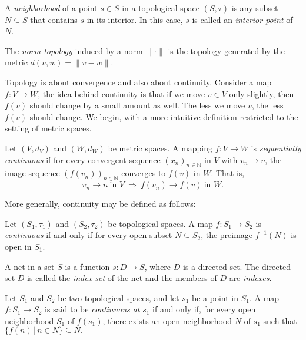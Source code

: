 \begin{definition}
A \emph{neighborhood} of a point \( s \in S \) in a topological space $(S, \tau)$ is any subset \( N \subseteq S  \) that contains \( s \) in its interior. In this case, \( s \) is called an \emph{interior point} of \( N \). 
\end{definition}

\begin{definition}
  The \emph{norm topology} induced by a norm $\|\cdot\|$ is the topology generated by the metric $d(v, w) = \|v - w\|$.
\end{definition}

Topology is about convergence and also about continuity. Consider a  map $f \colon V \to W$, the idea behind continuity is that if we move $v \in V$ only slightly, then $f(v)$ should change by a small amount as well. The less we move $v$, the less $f(v)$ should change. We begin, with a more intuitive definition restricted to the setting of metric spaces.

\begin{definition}
Let $(V,d_V)$ and $(W,d_W)$ be metric spaces. A mapping $f \colon V \to W$ is \emph{sequentially continuous} if for every convergent sequence $(x_n)_{n\in\mathbb{N}}$ in $V$ with $v_n \to v$, the image sequence $(f(v_n))_{n\in\mathbb{N}}$ converges to $f(v)$ in $W$. That is,
\[
v_n \to n \ \text{in } V \ \Rightarrow \ f(v_n) \to f(v) \ \text{in } W.
\]
\end{definition}
More generally, continuity may be defined as follows:
\begin{definition}
  Let $(S_1, \tau_1)$ and $(S_2, \tau_2)$ be topological spaces. A map $f \colon S_1 \to S_2$ is \emph{continuous} if and only if for every open subset $N \subseteq S_2$, the preimage $f^{-1}(N)$ is open in $S_1$.
\end{definition}

\begin{definition}
A net in a set $S$ is a function $s \colon D \to S$, where $D$ is a directed set. The directed set $D$ is called the \emph{index set} of the net and the members of $D$ are \emph{indexes}.
\end{definition}

\begin{definition}
  Let \( S_1 \) and \( S_2 \) be two topological spaces, and let \( s_1 \) be a point in \( S_1 \).  
A map \( f : S_1 \to S_2 \) is said to be \emph{continuous at} \( s_1 \) if and only if, for every open neighborhood \( S_1 \) of \( f(s_1) \), there exists an open neighborhood \( N \) of \( s_1 \) such that  
$
\{f(n) \, |\, n \in N \} \subseteq N.
$
\end{definition}




